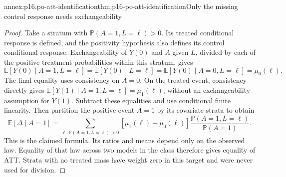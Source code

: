 \begin{annexitem}{annex:p16.po-att-identification}{thm:p16-po-att-identification}{Only the missing control response needs exchangeability}
\begin{proof}
Take a stratum with \(\mathbb P(A=1,L=\ell)>0\). Its treated
conditional response is defined, and the positivity hypothesis also
defines its control conditional response. Exchangeability of \(Y(0)\)
and \(A\) given \(L\), divided by each of the positive treatment
probabilities within this stratum, gives
\[
 \mathbb E[Y(0)\mid A=1,L=\ell]
 =\mathbb E[Y(0)\mid L=\ell]
 =\mathbb E[Y(0)\mid A=0,L=\ell]
 =\mu_0(\ell).
\]
The final equality uses consistency on \(A=0\). On the treated
event, consistency directly gives
\(\mathbb E[Y(1)\mid A=1,L=\ell]=\mu_1(\ell)\), without
an exchangeability assumption for \(Y(1)\). Subtract these
equalities and use conditional finite linearity. Then partition the
positive event \(A=1\) by its covariate strata to obtain
\[
 \mathbb E[\Delta\mid A=1]
 =\sum_{\ell:\mathbb P(A=1,L=\ell)>0}
    [\mu_1(\ell)-\mu_0(\ell)]
       \frac{\mathbb P(A=1,L=\ell)}{\mathbb P(A=1)}.
\]
This is the claimed formula. Its ratios and means depend only on the
observed law. Equality of that law across two models in the class
therefore gives equality of ATT. Strata with no treated mass have
weight zero in this target and were never used for division.
\end{proof}
\end{annexitem}

